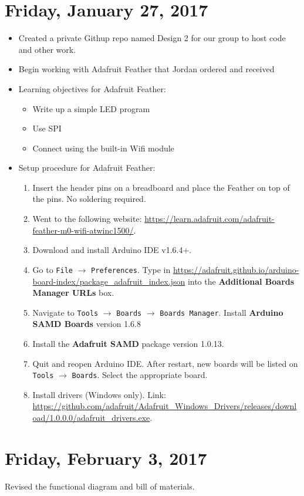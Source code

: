 \documentclass[12pt]{article}
\begin{document}
\section{Friday, January 27, 2017}
\begin{itemize}
\item Created a private Githup repo named Design 2 for our group to host code and other work.
\item Begin working with Adafruit Feather that Jordan ordered and received
\item Learning objectives for Adafruit Feather:
	\begin{itemize}
	\item Write up a simple LED program
	\item Use SPI
	\item Connect using the built-in Wifi module
	\end{itemize}
\item Setup procedure for Adafruit Feather:
	\begin{enumerate}
	\item Insert the header pins on a breadboard and place the Feather on top of the pins. No soldering required.
	\item Went to the following website: \url{https://learn.adafruit.com/adafruit-feather-m0-wifi-atwinc1500/}.
	\item Download and install Arduino IDE v1.6.4+.
	\item Go to \texttt{File} $\rightarrow$ \texttt{Preferences}. Type in \url{https://adafruit.github.io/arduino-board-index/package_adafruit_index.json} into the \textbf{Additional Boards Manager URLs} box.
	\item Navigate to \texttt{Tools} $\rightarrow$ \texttt{Boards} $\rightarrow$ \texttt{Boards Manager}. Install \textbf{Arduino SAMD Boards} version 1.6.8
	\item Install the \textbf{Adafruit SAMD} package version 1.0.13.
	\item Quit and reopen Arduino IDE. After restart, new boards will be listed on \texttt{Tools} $\rightarrow$ \texttt{Boards}. Select the appropriate board.
	\item Install drivers (Windows only). Link: \url{https://github.com/adafruit/Adafruit_Windows_Drivers/releases/download/1.0.0.0/adafruit_drivers.exe}.
	\end{enumerate}

\end{itemize}

\section{Friday, February 3, 2017}
Revised the functional diagram and bill of materials.
\end{document}
